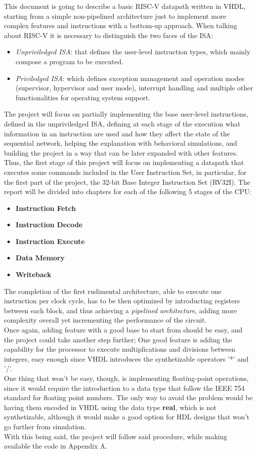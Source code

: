 This document is going to describe a basic RISC-V datapath written in VHDL, starting from a simple non-pipelined architecture just to implement more complex features and instructions with a bottom-up approach.
When talking about RISC-V it is necessary to distinguish the two faces of the ISA:
\begin{itemize}
    \item \emph{Unpriviledged ISA}: that defines the user-level instruction types, which mainly compose a program to be executed.
    \item \emph{Priviledged ISA}: which defines exception management and operation modes (supervisor, hypervisor and user mode), interrupt handling and multiple other functionalities for operating system support.
\end{itemize}
The project will focus on partially implementing the base user-level instructions, defined in the unpriviledged ISA, defining at each stage of the execution what information in an instruction are used and how they affect the state of the sequential network, helping the explanation with behavioral simulations, and building the project in a way that can be later expanded with other features.
Thus, the first stage of this project will focus on implementing a datapath that executes some commands included in the User Instruction Set, in particular, for the first part of the project, the 32-bit Base Integer Instruction Set (RV32I).
The report will be divided into chapters for each of the following 5 stages of the CPU:
\begin{itemize}
\item \textbf{Instruction Fetch}
\item \textbf{Instruction Decode} 
\item \textbf{Instruction Execute} 
\item \textbf{Data Memory}
\item \textbf{Writeback} 
\end{itemize}
The completion of the first rudimental architecture, able to execute one instruction per clock cycle, has to be then optimized by introducting registers between each block, and thus achieving a \emph{pipelined architecture}, adding more complexity overall yet incrementing the performance of the circuit.\\
Once again, adding feature with a good base to start from should be easy, and the project could take another step further; One good feature is adding the capability for the processor to execute multiplications and divisions between integers, easy enough since VHDL introduces the synthetizable operators '*' and '/'.\\
One thing that won't be easy, though, is implementing floating-point operations, since it would require the introduction to a data type that follow the IEEE 754 standard for floating point numbers. The only way to avoid the problem would be having them encoded in VHDL using the data type \textbf{real}, which is not synthetizable, although it would make a good option for HDL designs that won't go further from simulation.\\
With this being said, the project will follow said procedure, while making available the code in Appendix A.
